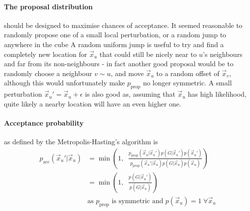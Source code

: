 \paragraph{The proposal distribution} should be designed to maximise chances of acceptance. It seemed reasonable to randomly propose one of a small local perturbation, or a random jump to anywhere in the cube
A random uniform jump is useful to try and find a completely new location for $\vec{x}_u$ that could still be nicely near to $u$'s neighbours and far from its non-neighbours - in fact another good proposal would be to randomly choose a neighbour $v \sim u$, and move $\vec{x}_u$ to a random offset of $\vec{x}_v$, although this would unfortunately make $p_{\mathrm{prop}}$ no longer symmetric.
A small perturbation $\vec{x}_u' = \vec{x}_u + \epsilon$ is also good as, assuming that $\vec{x}_u$ has high likelihood, quite likely a nearby location will have an even higher one.

\paragraph{Acceptance probability} as defined by the Metropolis-Hasting's algorithm is
\begin{align}
  p_{\mathrm{acc}}(\vec{x}_u' | \vec{x}_u) &= \min \left (1,\;\;  \frac{p_{\mathrm{prop}}(\vec{x}_u | \vec{x}_u') p(G | \vec{x}_u') p(\vec{x}_u')}{p_{\mathrm{prop}}(\vec{x}_u' | \vec{x}_u) p(G | \vec{x}_u) p(\vec{x}_u)}\right )
  \\
  &= \min \left (1,\;\;  \frac{p(G | \vec{x}_u')}{p(G | \vec{x}_u)} \right )
  \\
  & \text{as $p_{\mathrm{prop}}$ is symmetric and $p(\vec{x}_u) = 1\; \forall \vec{x}_u$}
\end{align}

